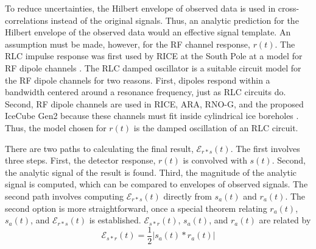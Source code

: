 \documentclass[amsmath,amssymb,aps,prd,10pt,twocolumn,showkeys]{revtex4}
\begin{document}
To reduce uncertainties, the Hilbert envelope of observed data is used in cross-correlations instead of the original signals.  Thus, an analytic prediction for the Hilbert envelope of the observed data would an effective signal template.  An assumption must be made, however, for the RF channel response, $r(t)$.  The RLC impulse response was first used by RICE at the South Pole at a model for RF dipole channels \cite{10.1103/PhysRevD.85.062004}.  The RLC damped oscillator is a suitable circuit model for the RF dipole channels for two reasons.  First, dipoles respond within a bandwidth centered around a resonance frequency, just as RLC circuits do.  Second, RF dipole channels are used in RICE, ARA, RNO-G, and the proposed IceCube Gen2 because these channels must fit inside cylindrical ice boreholes \cite{10.1103/PhysRevD.85.062004,10.1103/physrevd.102.043021,10.1016/j.astropartphys.2011.11.010,10.1088/1748-0221/16/03/p03025,10.48550/arxiv.2008.04323}.  Thus, the model chosen for $r(t)$ is the damped oscillation of an RLC circuit.

There are two paths to calculating the final result, $\mathcal{E}_{r*s}(t)$.  The first involves three steps.  First, the detector response, $r(t)$ is convolved with $s(t)$.  Second, the analytic signal of the result is found.  Third, the magnitude of the analytic signal is computed, which can be compared to envelopes of observed signals.  The second path involves computing $\mathcal{E}_{r*s}(t)$ directly from $s_a(t)$ and $r_a(t)$.  The second option is more straightforward, once a special theorem relating $r_a(t)$, $s_a(t)$, and $\mathcal{E}_{r*s}(t)$ is established.  $\mathcal{E}_{s * r}(t)$, $s_a(t)$, and $r_a(t)$ are related by
\begin{equation}
\mathcal{E}_{s * r}(t) = \frac{1}{2}| s_a (t) * r_a(t)| \label{eq:awesome}
\end{equation}
\end{document}

